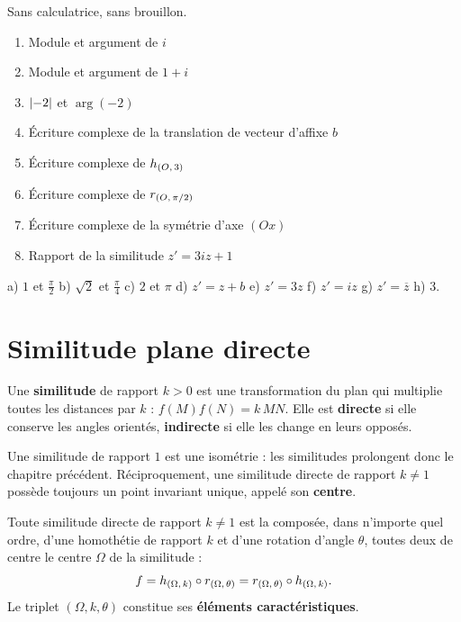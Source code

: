 \begin{automatismes}
Sans calculatrice, sans brouillon.

\begin{enumerate}[label=\textbf{\alph*)}, leftmargin=*, itemsep=0.25em]
  \item Module et argument de $i$
  \item Module et argument de $1+i$
  \item $\left|-2\right|$ et $\arg(-2)$
  \item Écriture complexe de la translation de vecteur d'affixe $b$
  \item Écriture complexe de $h_{(O,\,3)}$
  \item Écriture complexe de $r_{(O,\,\pi/2)}$
  \item Écriture complexe de la symétrie d'axe $(Ox)$
  \item Rapport de la similitude $z' = 3iz+1$
\end{enumerate}
\end{automatismes}

\begin{corrige}[automatismes]
a) $1$ et $\frac{\pi}{2}$ \quad b) $\sqrt2$ et $\frac{\pi}{4}$ \quad
c) $2$ et $\pi$ \quad d) $z' = z+b$ \quad e) $z' = 3z$ \quad
f) $z' = iz$ \quad g) $z' = \overline z$ \quad h) $3$.
\end{corrige}

\section{Similitude plane directe}

\begin{definition}[similitude]
Une \textbf{similitude} de rapport $k>0$ est une transformation du plan qui
multiplie toutes les distances par $k$ :
$f(M)f(N) = k\,MN$. Elle est \textbf{directe} si elle conserve les angles
orientés, \textbf{indirecte} si elle les change en leurs opposés.
\end{definition}

\begin{remarque}
Une similitude de rapport $1$ est une isométrie : les similitudes prolongent
donc le chapitre précédent. Réciproquement, une similitude directe de rapport
$k \neq 1$ possède toujours un point invariant unique, appelé son
\textbf{centre}.
\end{remarque}

\begin{theoreme}
Toute similitude directe de rapport $k \neq 1$ est la composée, dans n'importe
quel ordre, d'une homothétie de rapport $k$ et d'une rotation d'angle
$\theta$, toutes deux de centre le centre $\Omega$ de la similitude :
\[
  f = h_{(\Omega,\,k)} \circ r_{(\Omega,\,\theta)}
    = r_{(\Omega,\,\theta)} \circ h_{(\Omega,\,k)}.
\]
Le triplet $(\Omega,k,\theta)$ constitue ses \textbf{éléments
caractéristiques}.
\end{theoreme}

